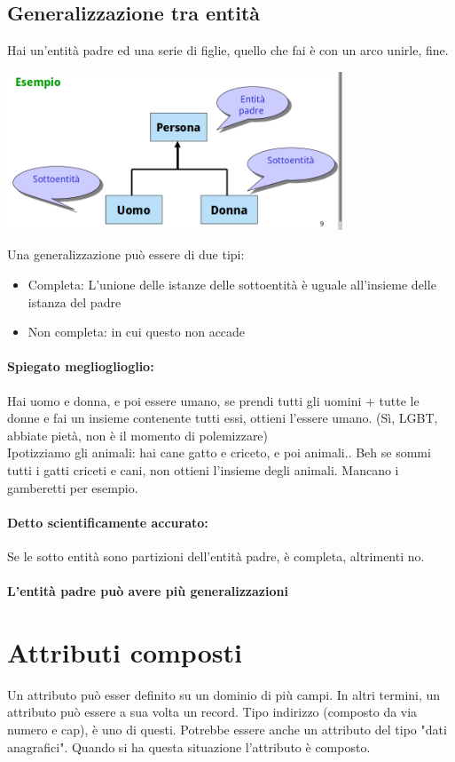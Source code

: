 \documentclass[12pt, a4paper, openany, twoside]{book}
\begin{document}
\subsection{Generalizzazione tra entità}
Hai un'entità padre ed una serie di figlie, quello che fai è con un arco unirle,
fine. 
\begin{center}
\includegraphics[width=0.75\textwidth]{5.png}
\end{center}
Una generalizzazione può essere di due tipi:
\begin{itemize}
	\item Completa: L'unione delle istanze delle sottoentità è uguale all'insieme
	delle istanza del padre
	\item Non completa: in cui questo non accade
\end{itemize}
\paragraph{Spiegato meglioglioglio:} Hai uomo e donna, e poi essere umano, se prendi
tutti gli uomini + tutte le donne e fai un insieme contenente tutti essi, ottieni
l'essere umano. (Sì, LGBT, abbiate pietà, non è il momento di polemizzare) \\
Ipotizziamo gli animali: hai cane gatto e criceto, e poi animali.. Beh se sommi
tutti i gatti criceti e cani, non ottieni l'insieme degli animali. Mancano i
gamberetti per esempio.
\paragraph{Detto scientificamente accurato:} Se le sotto entità sono partizioni
dell'entità padre, è completa, altrimenti no.
\paragraph{L'entità padre può avere più generalizzazioni}
\section{Attributi composti} Un attributo può esser definito su un dominio di più
campi. In altri termini, un attributo può essere a sua volta un record. Tipo
indirizzo (composto da via numero e cap), è uno di questi. Potrebbe essere anche
un attributo del tipo "dati anagrafici". Quando si ha questa situazione l'attributo
è composto.
\end{document}
